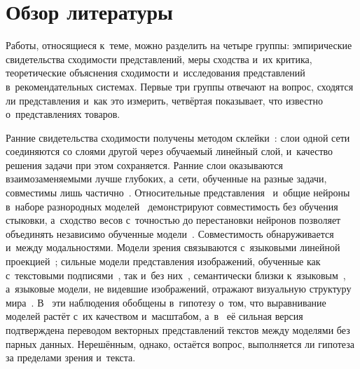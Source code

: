 \documentclass[a4paper,12pt]{article}
\begin{document}
\section{Обзор литературы}\label{sec:review}

Работы, относящиеся к~теме, можно разделить на четыре группы: эмпирические
свидетельства сходимости представлений, меры сходства и~их критика, теоретические
объяснения сходимости и~исследования представлений в~рекомендательных системах.
Первые три группы отвечают на вопрос, сходятся ли представления и~как это измерить,
четвёртая показывает, что известно о~представлениях товаров.

Ранние свидетельства сходимости получены методом склейки~\cite{lenc2015equivariance,bansal2021stitching}:
слои одной сети соединяются со слоями другой через обучаемый линейный слой, и~качество
решения задачи при этом сохраняется. Ранние слои оказываются взаимозаменяемыми лучше
глубоких, а~сети, обученные на разные задачи, совместимы лишь
частично~\cite{lenc2015equivariance}. Относительные представления~\cite{moschella2023relative}
и~общие нейроны в~наборе разнородных моделей~\cite{dravid2023rosetta} демонстрируют
совместимость без обучения стыковки, а~сходство весов с~точностью до перестановки
нейронов позволяет объединять независимо обученные модели~\cite{ainsworth2023rebasin}.
Совместимость обнаруживается и~между модальностями. Модели зрения связываются
с~языковыми линейной проекцией~\cite{merullo2023linearly}; сильные модели
представления изображений, обученные как с~текстовыми подписями~\cite{radford2021clip},
так и~без них~\cite{oquab2024dinov2}, семантически близки к~языковым~\cite{maniparambil2024},
а~языковые модели, не видевшие изображений, отражают визуальную структуру
мира~\cite{sharma2024checkup,abdou2021color}. В~\cite{huh2024platonic} эти наблюдения
обобщены в~гипотезу о~том, что выравнивание моделей растёт с~их качеством и~масштабом,
а~в~\cite{jha2025vec2vec} её сильная версия подтверждена переводом векторных
представлений текстов между моделями без парных данных. Нерешённым, однако, остаётся
вопрос, выполняется ли гипотеза за пределами зрения и~текста.
\end{document}
